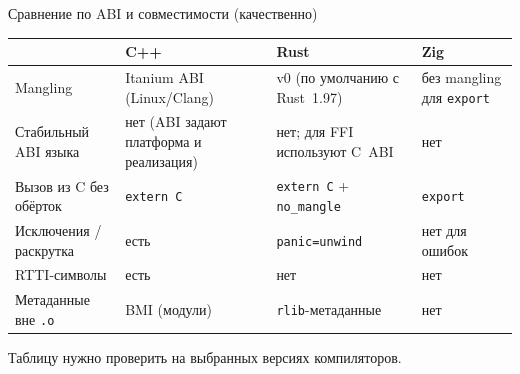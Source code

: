 \documentclass[aspectratio=169,11pt]{beamer}
\newcommand{\externC}{\texttt{extern~\textquotedbl C\textquotedbl}}
\begin{document}
\begin{frame}{Сравнение по ABI и совместимости (качественно)}
  \footnotesize
  \begin{center}
    \begin{tabularx}{0.98\textwidth}{lYYY}
      \toprule
                                 & C++ \cite{itanium}                      & Rust \cite{rustref}                       & Zig \cite{zigdoc}                    \\
      \midrule
      Mangling                   & Itanium ABI (Linux/Clang)               & v0 (по умолчанию с Rust~1.97)             & без mangling для \texttt{export}     \\
      Стабильный ABI языка       & нет (ABI задают платформа и реализация)   & нет; для FFI используют C~ABI             & нет                                  \\
      Вызов из C без обёрток     & \externC                                & \externC{} + \texttt{no\_mangle}          & \texttt{export}                      \\
      Исключения / раскрутка     & есть                                    & \texttt{panic=unwind}                     & нет для ошибок                       \\
      RTTI-символы               & есть                                    & нет                                       & нет                                  \\
      Метаданные вне \texttt{.o} & BMI (модули)                            & \texttt{rlib}-метаданные                  & нет                                  \\
      \bottomrule
    \end{tabularx}
  \end{center}
  \medskip
  Таблицу нужно проверить на выбранных версиях компиляторов.
\end{frame}
\end{document}
